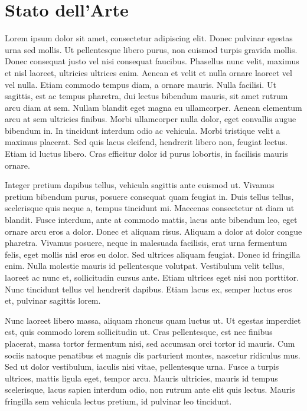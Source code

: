 \chapter{Stato dell'Arte}

Lorem ipsum dolor sit amet, consectetur adipiscing elit. Donec pulvinar egestas urna sed mollis. Ut pellentesque libero purus, non euismod turpis gravida mollis. Donec consequat justo vel nisi consequat faucibus. Phasellus nunc velit, maximus et nisl laoreet, ultricies ultrices enim. Aenean et velit et nulla ornare laoreet vel vel nulla. Etiam commodo tempus diam, a ornare mauris. Nulla facilisi. Ut sagittis, est ac tempus pharetra, dui lectus bibendum mauris, sit amet rutrum arcu diam at sem. Nullam blandit eget magna eu ullamcorper. Aenean elementum arcu at sem ultricies finibus. Morbi ullamcorper nulla dolor, eget convallis augue bibendum in. In tincidunt interdum odio ac vehicula. Morbi tristique velit a maximus placerat. Sed quis lacus eleifend, hendrerit libero non, feugiat lectus. Etiam id luctus libero. Cras efficitur dolor id purus lobortis, in facilisis mauris ornare.

Integer pretium dapibus tellus, vehicula sagittis ante euismod ut. Vivamus pretium bibendum purus, posuere consequat quam feugiat in. Duis tellus tellus, scelerisque quis neque a, tempus tincidunt mi. Maecenas consectetur at diam ut blandit. Fusce interdum, ante at commodo mattis, lacus ante bibendum leo, eget ornare arcu eros a dolor. Donec et aliquam risus. Aliquam a dolor at dolor congue pharetra. Vivamus posuere, neque in malesuada facilisis, erat urna fermentum felis, eget mollis nisl eros eu dolor. Sed ultrices aliquam feugiat. Donec id fringilla enim. Nulla molestie mauris id pellentesque volutpat. Vestibulum velit tellus, laoreet ac nunc et, sollicitudin cursus ante. Etiam ultrices eget nisi non porttitor. Nunc tincidunt tellus vel hendrerit dapibus. Etiam lacus ex, semper luctus eros et, pulvinar sagittis lorem.

Nunc laoreet libero massa, aliquam rhoncus quam luctus ut. Ut egestas imperdiet est, quis commodo lorem sollicitudin ut. Cras pellentesque, est nec finibus placerat, massa tortor fermentum nisi, sed accumsan orci tortor id mauris. Cum sociis natoque penatibus et magnis dis parturient montes, nascetur ridiculus mus. Sed ut dolor vestibulum, iaculis nisi vitae, pellentesque urna. Fusce a turpis ultrices, mattis ligula eget, tempor arcu. Mauris ultricies, mauris id tempus scelerisque, lacus sapien interdum odio, non rutrum ante elit quis lectus. Mauris fringilla sem vehicula lectus pretium, id pulvinar leo tincidunt.